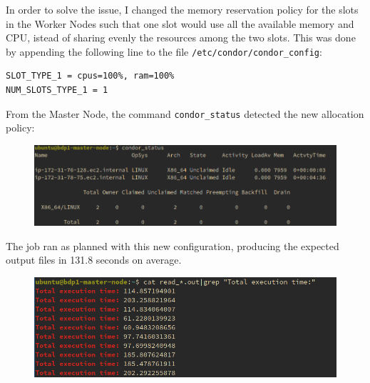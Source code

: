 \documentclass{article}
\begin{document}
In order to solve the issue, I changed the memory reservation policy for the slots in the Worker Nodes such that one slot would use all the available memory and CPU, istead of sharing evenly the resources among the two slots.
This was done by appending the following line to the file \texttt{/etc/condor/condor\_config}:
\begin{lstlisting}
SLOT_TYPE_1 = cpus=100%, ram=100%
NUM_SLOTS_TYPE_1 = 1
\end{lstlisting}
From the Master Node, the command \texttt{condor\_status} detected the new allocation policy:
\begin{figure}[!h]
    \center
    \includegraphics[width=\textwidth]{./images/condor_slot_single.png}
\end{figure}
\FloatBarrier

The job ran as planned with this new configuration, producing the expected output files in 131.8 seconds on average.
\begin{figure}[!h]
    \center
    \includegraphics[width=\textwidth]{./images/docker_time.png}
\end{figure}
\FloatBarrier
\end{document}
